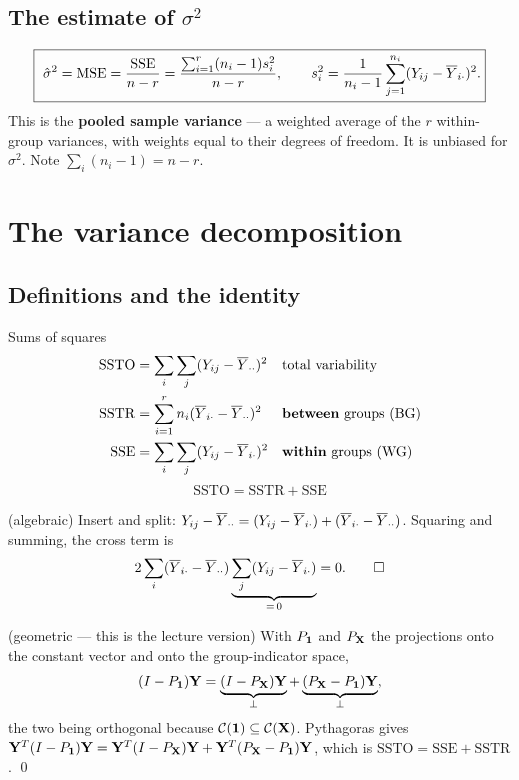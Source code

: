 \documentclass[11pt]{article}
\begin{document}
\subsection{The estimate of $\sigma^2$}

\[
  \boxed{\ \hat\sigma^2=\mathrm{MSE}=\frac{\mathrm{SSE}}{n-r}
  =\frac{\sum_{i=1}^r(n_i-1)s_i^2}{n-r},
  \qquad s_i^2=\frac1{n_i-1}\sum_{j=1}^{n_i}(Y_{ij}-\Ybar_{i\cdot})^2 . }
\]
This is the \textbf{pooled sample variance} --- a weighted average of the $r$ within-group
variances, with weights equal to their degrees of freedom. It is unbiased for $\sigma^2$.
Note $\sum_i(n_i-1)=n-r$.

\section{The variance decomposition}

\subsection{Definitions and the identity}

\begin{idea}{Sums of squares}
\begin{align*}
  \mathrm{SSTO}&=\sum_{i}\sum_j (Y_{ij}-\overline{Y}_{\cdot\cdot})^2 && \text{total variability}\\
  \mathrm{SSTR}&=\sum_{i=1}^r n_i(\overline{Y}_{i\cdot}-\overline{Y}_{\cdot\cdot})^2 && \text{\textbf{between} groups (BG)}\\
  \mathrm{SSE}&=\sum_i\sum_j (Y_{ij}-\overline{Y}_{i\cdot})^2 && \text{\textbf{within} groups (WG)}
\end{align*}
\[
  \boxed{\ \mathrm{SSTO}=\mathrm{SSTR}+\mathrm{SSE}\ }
\]
\end{idea}

\prf (algebraic) Insert and split: $Y_{ij}-\overline{Y}_{\cdot\cdot}=(Y_{ij}-\overline{Y}_{i\cdot})+(\overline{Y}_{i\cdot}-\overline{Y}_{\cdot\cdot})$.
Squaring and summing, the cross term is
\[
  2\sum_i(\overline{Y}_{i\cdot}-\overline{Y}_{\cdot\cdot})\underbrace{\sum_j(Y_{ij}-\overline{Y}_{i\cdot})}_{=\,0}=0 . \qquad\square
\]

\prf (geometric --- this is the lecture version) With $P_{\mathbf{1}}$ and $P_{\mathbf{X}}$ the projections
onto the constant vector and onto the group-indicator space,
\[
  (I-P_{\mathbf{1}})\mathbf{Y}=\underbrace{(I-P_{\mathbf{X}})\mathbf{Y}}_{\perp}+\underbrace{(P_{\mathbf{X}}-P_{\mathbf{1}})\mathbf{Y}}_{\perp} ,
\]
the two being orthogonal because $\mathcal{C}(\mathbf{1})\subseteq\mathcal{C}(\mathbf{X})$. Pythagoras gives
$\mathbf{Y}^T(I-P_{\mathbf{1}})\mathbf{Y}=\mathbf{Y}^T(I-P_{\mathbf{X}})\mathbf{Y}+\mathbf{Y}^T(P_{\mathbf{X}}-P_{\mathbf{1}})\mathbf{Y}$, which is
$\mathrm{SSTO}=\mathrm{SSE}+\mathrm{SSTR}$. \qed
\end{document}
